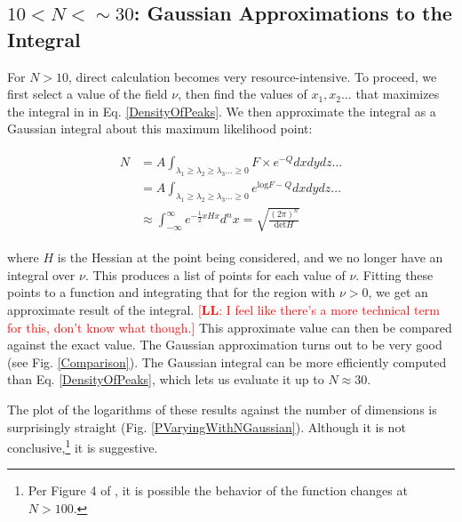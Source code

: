 \documentclass[12pt]{article}
\newcommand{\lfl}[1]{\textcolor{red}{[{\bf LL}: #1]}}
\begin{document}

\subsection{$10 < N < \sim30$: Gaussian Approximations to the Integral}
For $N>10$, direct calculation becomes very resource-intensive. To proceed, we first select a value of the field $\nu$, then find the values of $x_1, x_2 \ldots$ that maximizes the integral in in Eq. \ref{DensityOfPeaks}. We then approximate the integral as a Gaussian integral about this maximum likelihood point:

\begin{align*}
\begin{split}
N &= A \int_{\lambda_1 \geq \lambda_2 \geq \lambda_3 \ldots \geq 0} F \times e^{-Q} dx dy dz \ldots \\
&=A\int_{\lambda_1 \geq \lambda_2 \geq \lambda_3 \ldots \geq 0} e^{\mathrm{log}F-Q} dx dy dz \ldots \\
&\approx \int_{-\infty}^{\infty} e^{-\frac{1}{2}xHx} d^nx = \sqrt{\frac{(2\pi)^n}{\mathrm{det} H}}
\end{split}
\end{align*}

\noindent where $H$ is the Hessian at the point being considered, and we no longer have an integral over $\nu$. This produces a list of points for each value of $\nu$. Fitting these points to a function and integrating that for the region with $\nu > 0$, we get an approximate result of the integral. \lfl{I feel like there's a more technical term for this, don't know what though.} This approximate value can then be compared against the exact value. The Gaussian approximation turns out to be very good (see Fig. \ref{Comparison}). The Gaussian integral can be more efficiently computed than Eq. \ref{DensityOfPeaks}, which lets us evaluate it up to $N\approx30$.

The plot of the logarithms of these results against the number of dimensions is surprisingly straight (Fig. \ref{PVaryingWithNGaussian}). Although it is not conclusive,\footnote{Per Figure 4 of \cite{Yamada2018}, it is possible the behavior of the function changes at $N >100$.} it is suggestive.
\end{document}
